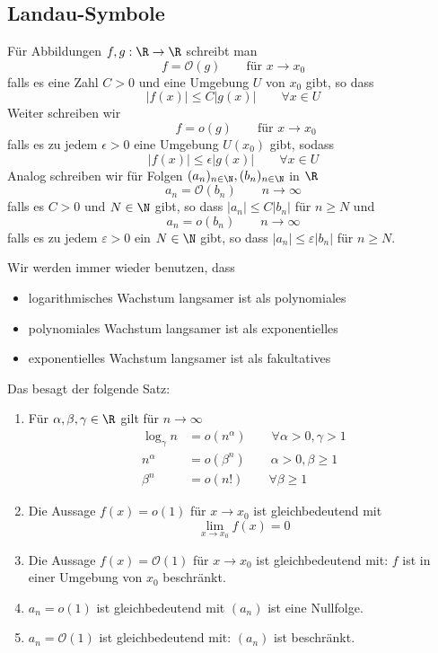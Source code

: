 \documentclass[a4paper]{scrartcl}
\numberwithin{equation}{section}
\begin{document}
\subsection{Landau-Symbole}
Für Abbildungen $f,g:\R\to\R$ schreibt man
\[
f=\mathcal{O}(g) \qquad \text{für } x\to x_0
\]
falls es eine Zahl $C>0$ und eine Umgebung $U$ von $x_0$ gibt, so dass
\[
|f(x)|\le C|g(x)| \qquad \forall x\in U
\]
Weiter schreiben wir
\[
 \qquad f=o(g) \qquad \text{für } x\to x_0
\]
falls es zu jedem $\epsilon>0$ eine Umgebung $U(x_0)$ gibt, sodass
\[
|f(x)|\le \epsilon |g(x)| \qquad \forall x\in U
\]
Analog schreiben wir für Folgen $(a_n)_{n\in \N}, (b_n)_{n\in \N}$ in $\R$
\[
a_n=\mathcal{O}(b_n) \qquad n\to\infty
\]
falls es $C>0$ und $N\in\N$  gibt, so dass $|a_n|\le C|b_n|$ für $n\ge N$ und
\[
a_n=o(b_n) \qquad n\to\infty
\]
falls es zu jedem $\varepsilon > 0$ ein $N\in\N$ gibt, so dass $|a_n|\le\varepsilon |b_n|$ für $n\ge N$.

Wir werden immer wieder benutzen, dass
\begin{itemize}
\item logarithmisches Wachstum langsamer ist als polynomiales
\item polynomiales Wachstum langsamer ist als exponentielles
\item exponentielles Wachstum langsamer ist als fakultatives
\end{itemize}
Das besagt der folgende Satz:
\begin{st}
\label{st:2.3}
\begin{enumerate}
\item
Für $\alpha, \beta,\gamma\in \R$ gilt für $n\to \infty$
\begin{align*}
\log_\gamma n &=o(n^\alpha) \qquad \forall \alpha>0,\gamma>1\\
n^\alpha &= o(\beta^n)\qquad \alpha>0, \beta\ge1 \\
\beta^n &=o(n!) \qquad \forall \beta\ge 1
\end{align*}
\item
Die  Aussage $f(x)=o(1)$ für $x\to x_0$ ist gleichbedeutend mit
\[
\lim_{x\to x_0}f(x)=0
\]
\item
Die Aussage $f(x)=\mathcal{O}(1)$ für $x\to x_0$ ist gleichbedeutend mit: 
$f$ ist in einer Umgebung von $x_0$ beschränkt.
\item
$a_n=o(1)$ ist gleichbedeutend mit $(a_n)$ ist eine Nullfolge.
\item
$a_n=\mathcal{O}(1)$ ist gleichbedeutend mit: $(a_n)$ ist beschränkt.
\end{enumerate}


\end{st}
\end{document}
